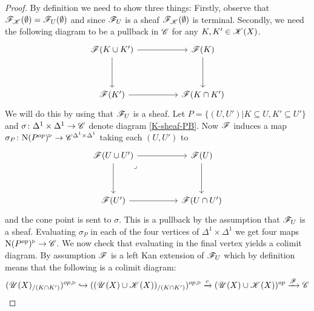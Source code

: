 \documentclass[../../thesis.tex]{subfiles}
\begin{document}
\begin{proof}
    By definition we need to show three things:
    Firstly, observe that $\mathscr{F}_{\mathscr{K}}(\emptyset) = \mathscr{F}_{U}(\emptyset)$ and since $\mathscr{F}_{U}$ is a sheaf $\mathscr{F}_{\mathscr{K}}(\emptyset)$ is terminal.
    Secondly, we need the following diagram to be a pullback in $\mathscr{C}$ for any $K,K' \in \mathscr{K}(X)$.
    \begin{equation}\label{K-sheaf-PB}
        \begin{tikzcd}
            {\F(K \cup K')} && {\F(K)} \\
            \\
            {\F(K')} && {\F(K\cap K')}
            \arrow[from=1-3, to=3-3]
            \arrow[from=3-1, to=3-3]
            \arrow[from=1-1, to=3-1]
            \arrow[from=1-1, to=1-3]
        \end{tikzcd}
    \end{equation}
    We will do this by using that $\mathscr{F}_{U}$ is a sheaf.
    Let $P = \{(U,U') | K \subseteq U, K' \subseteq U'\}$ and $\sigma\colon \Delta^1\times\Delta^1 \to \mathscr{C}$ denote diagram \ref{K-sheaf-PB}.
    Now $\mathscr{F}$ induces a map $\sigma_P\colon \mathrm{N}(P^{op})^{\triangleright} \to \mathscr{C}^{\Delta^1\times\Delta^1}$ taking each $(U, U')$ to
    \[
        \begin{tikzcd}
            {\F(U \cup U')} && {\F(U)} \\
            \\
            {\F(U')} && {\F(U\cap U')}
            \arrow[from=1-3, to=3-3]
            \arrow[from=3-1, to=3-3]
            \arrow[from=1-1, to=3-1]
            \arrow["\lrcorner"{anchor=center, pos=0.125}, draw=none, from=1-1, to=3-3]
            \arrow[from=1-1, to=1-3]
        \end{tikzcd}
    \]
    and the cone point is sent to $\sigma$. This is a pullback by the assumption that $\mathscr{F}_{U}$ is a sheaf.
    Evaluating $\sigma_P$ in each of the four vertices of $\Delta^1 \times \Delta^1$ we get four maps $\mathrm{N}(P^{op})^{\triangleright} \to \mathscr{C}$.
    We now check that evaluating in the final vertex yields a colimit diagram.
    By assumption $\mathscr{F}$ is a left Kan extension of $\mathscr{F}_{U}$ which by definition means that the following is a colimit diagram:
    \[
        (\mathscr{U}(X)_{/(K\cap K')})^{op,\triangleright} \hookrightarrow ((\mathscr{U}(X) \cup \mathscr{K}(X))_{/(K\cap K')})^{op,\triangleright} \xrightarrow{c} (\mathscr{U}(X) \cup \mathscr{K}(X))^{op} \xrightarrow{\mathscr{F}}\mathscr{C}
\]
\end{proof}
\end{document}
